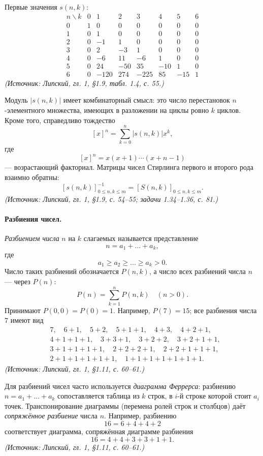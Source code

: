 \documentclass[a4paper,12pt]{article}
\begin{document}
Первые значения \(s(n,k)\):
\[
\begin{array}{c|ccccccc}
n\backslash k & 0 & 1 & 2 & 3 & 4 & 5 & 6\\\hline
0 & 1 & 0 & 0 & 0 & 0 & 0 & 0\\
1 & 0 & 1 & 0 & 0 & 0 & 0 & 0\\
2 & 0 & -1 & 1 & 0 & 0 & 0 & 0\\
3 & 0 & 2 & -3 & 1 & 0 & 0 & 0\\
4 & 0 & -6 & 11 & -6 & 1 & 0 & 0\\
5 & 0 & 24 & -50 & 35 & -10 & 1 & 0\\
6 & 0 & -120 & 274 & -225 & 85 & -15 & 1
\end{array}
\]
\textit{(Источник: Липский, гл. 1, §1.9, табл. 1.4, с. 55.)}

Модуль \(|s(n,k)|\) имеет комбинаторный смысл: это число перестановок \(n\)-элементного множества, имеющих в разложении на циклы ровно \(k\) циклов. Кроме того, справедливо тождество
\[
[x]^n=\sum_{k=0}^{n}|s(n,k)|x^k,
\]
где
\[
[x]^n=x(x+1)\cdots(x+n-1)
\]
--- возрастающий факториал. Матрицы чисел Стирлинга первого и второго рода взаимно обратны:
\[
[s(n,k)]_{0\le n,k\le m}^{-1}=[S(n,k)]_{0\le n,k\le m}.
\]
\textit{(Источник: Липский, гл. 1, §1.9, с. 54--55; задачи 1.34--1.36, с. 81.)}

\paragraph{Разбиения чисел.}
\emph{Разбиением числа} \(n\) на \(k\) слагаемых называется представление
\[
n=a_1+\dots+a_k,
\]
где
\[
a_1\ge a_2\ge\dots\ge a_k>0.
\]
Число таких разбиений обозначается \(P(n,k)\), а число всех разбиений числа \(n\) — через \(P(n)\):
\[
P(n)=\sum_{k=1}^{n}P(n,k)\quad(n>0).
\]
Принимают \(P(0,0)=P(0)=1\). Например, \(P(7)=15\); все разбиения числа \(7\) имеют вид
\[
\begin{aligned}
&7,\quad 6+1,\quad 5+2,\quad 5+1+1,\quad 4+3,\quad 4+2+1,\\
&4+1+1+1,\quad 3+3+1,\quad 3+2+2,\quad 3+2+1+1,\\
&3+1+1+1+1,\quad 2+2+2+1,\quad 2+2+1+1+1,\\
&2+1+1+1+1+1,\quad 1+1+1+1+1+1+1.
\end{aligned}
\]
\textit{(Источник: Липский, гл. 1, §1.11, с. 60--61.)}

Для разбиений чисел часто используется \emph{диаграмма Феррерса}: разбиению \(n=a_1+\dots+a_k\) сопоставляется таблица из \(k\) строк, в \(i\)-й строке которой стоит \(a_i\) точек. Транспонирование диаграммы (перемена ролей строк и столбцов) даёт \emph{сопряжённое разбиение} числа \(n\). Например, разбиению
\[
16=6+4+4+2
\]
соответствует диаграмма, сопряжённая диаграмме разбиения
\[
16=4+4+3+3+1+1.
\]
\textit{(Источник: Липский, гл. 1, §1.11, с. 60--61.)}
\end{document}
